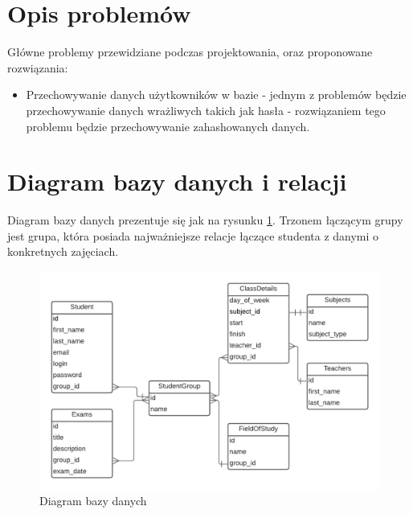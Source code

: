 \documentclass[a4paper,11pt]{uzreport}
\begin{document}
\section{Opis problemów}
	Główne problemy przewidziane podczas projektowania, oraz proponowane rozwiązania:

	\begin{itemize}[leftmargin=0.5in]
            
		\item Przechowywanie danych użytkowników w bazie - jednym z problemów będzie przechowywanie danych wrażliwych takich jak hasła - 			 			rozwiązaniem tego problemu będzie przechowywanie zahashowanych danych.
                
 	\end{itemize}

\section{Diagram bazy danych i relacji}
    Diagram bazy danych prezentuje się jak na rysunku \ref{fig11}. Trzonem łączącym grupy jest grupa, która posiada najważniejsze relacje łączące studenta z danymi o konkretnych zajęciach. 
    \begin{figure}[ht!]
        \centering
        \includegraphics[width=6in]{pictures/UZplaner-baza-danych.png}
        \caption{Diagram bazy danych}
        \label{fig11}
     \end{figure}
\end{document}
